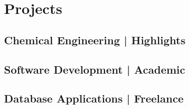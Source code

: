 \newcommand{\statementSpace}{%
\vspace{0.25em}\\
}
%
%
%
%
%
\justifying
%
%
%
%
\summary{%

}
%
%
%
%
\section{Projects}%
%
\subsection{Chemical Engineering | Highlights}
%

%
\subsection{Software Development | Academic}
%

%
\subsection{Database Applications | Freelance}
%

%
%